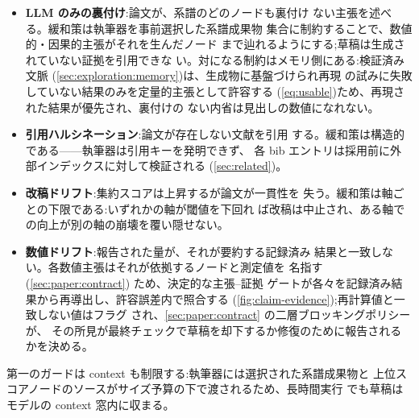 \begin{itemize}
  \item \textbf{LLM のみの裏付け}:論文が、系譜のどのノードも裏付け
        ない主張を述べる。緩和策は執筆器を事前選択した系譜成果物
        集合に制約することで、数値的・因果的主張がそれを生んだノード
        まで辿れるようにする;草稿は生成されていない証拠を引用できな
        い。対になる制約はメモリ側にある:検証済み文脈
        (\cref{sec:exploration:memory})は、生成物に基盤づけられ再現
        の試みに失敗していない結果のみを定量的主張として許容する
        (\cref{eq:usable})ため、再現された結果が優先され、裏付けの
        ない内省は見出しの数値になれない。
  \item \textbf{引用ハルシネーション}:論文が存在しない文献を引用
        する。緩和策は構造的である——執筆器は引用キーを発明できず、
        各 bib エントリは採用前に外部インデックスに対して検証される
        (\cref{sec:related})。
  \item \textbf{改稿ドリフト}:集約スコアは上昇するが論文が一貫性を
        失う。緩和策は軸ごとの下限である:いずれかの軸が閾値を下回れ
        ば改稿は中止され、ある軸での向上が別の軸の崩壊を覆い隠せない。
  \item \textbf{数値ドリフト}:報告された量が、それが要約する記録済み
        結果と一致しない。各数値主張はそれが依拠するノードと測定値を
        名指す (\cref{sec:paper:contract}) ため、決定的な主張--証拠
        ゲートが各々を記録済み結果から再導出し、許容誤差内で照合する
        (\cref{fig:claim-evidence});再計算値と一致しない値はフラグ
        され、\cref{sec:paper:contract} の二層ブロッキングポリシーが、
        その所見が最終チェックで草稿を却下するか修復のために報告される
        かを決める。
\end{itemize}

第一のガードは context も制限する:執筆器には選択された系譜成果物と
上位スコアノードのソースがサイズ予算の下で渡されるため、長時間実行
でも草稿はモデルの context 窓内に収まる。
